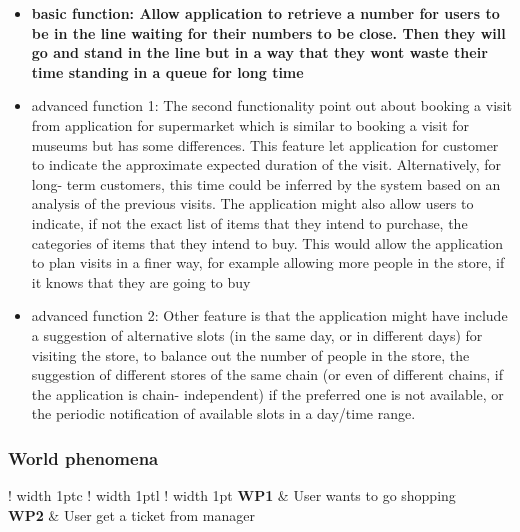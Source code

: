 \begin{itemize}
\item \textbf{basic function: Allow application to retrieve a number for users to be in the line waiting for their numbers to be close. Then they will go and stand in the line but in a way that they wont waste their time standing in a queue for long time}
\item advanced function 1: The second functionality point out about booking a visit from application for supermarket which is similar to booking a visit for museums but has some differences. This feature let application for customer to indicate the approximate expected duration of the visit. Alternatively, for long- 
term customers, this time could be inferred by the system based on an analysis of the previous visits.  
The application might also allow users to indicate, if not the exact list of items that they intend to  
purchase, the categories of items that they intend to buy. This would allow the application to plan visits  
in a finer way, for example allowing more people in the store, if it knows that they are going to buy
\item advanced function 2: Other feature is that the application might have include a suggestion of alternative slots (in the same  
day, or in different days) for visiting the store, to balance out the number of people in the store, the  
suggestion of different stores of the same chain (or even of different chains, if the application is chain- 
independent) if the preferred one is not available, or the periodic notification of available slots in a  
day/time range.
\end{itemize}


\subsubsection{World phenomena}
\newcommand{\Vline}{\color{lightBlueBorder} \vrule width 1pt}
\def\arraystretch{1.5}

\setlength\arrayrulewidth{1pt}
\setlength\LTleft{0pt}

\begin{longtable}{!\Vline c !\Vline l !\Vline} 
    \hline
    \textbf{WP1} & User wants to go shopping  \\
    \textbf{WP2} & User get a ticket from manager  \\  \hline
\end{longtable}

